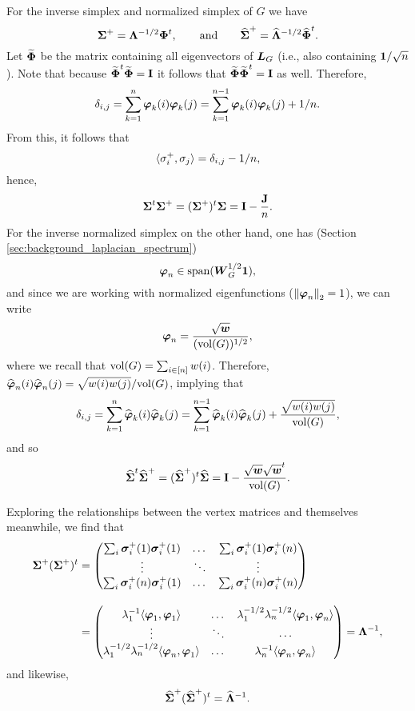 For the inverse simplex and normalized simplex of $G$ we have 
\[\boldsymbol{\Sigma}^+ = \vb{\Lambda}^{-1/2}\boldsymbol{\Phi}^t,\qquad \text{and} \qquad \widehat{\boldsymbol{\Sigma}}^+ = \widehat{\vb{\Lambda}}^{-1/2}\widehat{\boldsymbol{\Phi}}^t.\]
Let $\widetilde{\boldsymbol{\Phi}}$ be the matrix containing all eigenvectors of $\vb*{L}_G$ (i.e., also containing $\vb{1}/\sqrt{n}$).  Note that because $\widetilde{\boldsymbol{\Phi}}^t \widetilde{\boldsymbol{\Phi}}=\vb{I}$ it follows that $\widetilde{\boldsymbol{\Phi}}\widetilde{\boldsymbol{\Phi}}^t=\vb{I}$ as well. Therefore, 
\begin{equation*}\delta_{i,j}=\sum_{k=1}^n \vb*{\varphi}_k(i)\vb*{\varphi}_k(j) = \sum_{k=1}^{n-1} \vb*{\varphi}_k(i)\vb*{\varphi}_k(j) + 1/n.
\end{equation*}
From this, it follows that 
\[\langle\sigma_i^+,\sigma_j\rangle = \delta_{i,j} - 1/n,\]
hence, 
\begin{equation}
\label{eq:sv+sv}
    \boldsymbol{\Sigma}^t\boldsymbol{\Sigma}^+=(\boldsymbol{\Sigma}^+)^t\boldsymbol{\Sigma}=\vb{I}-\frac{\vb{J}}{n}.
\end{equation}
For the inverse normalized simplex on the other hand, one has (Section \ref{sec:background_laplacian_spectrum})
\[\vb*{\varphi}_n \in \textnormal{span}(\vb*{W}_G^{1/2}\vb{1} ),\]
and since we are working with normalized eigenfunctions ($\norm{\vb*{\varphi}_n}_2=1$), we can write 
\[\vb*{\varphi}_n = \frac{\sqrt{\vb*{w}}}{(\textnormal{vol}(G))^{1/2}},\]
where we recall that $\textnormal{vol}(G)=\sum_{i\in[n]} w(i)$. 
Therefore, $\widehat{\vb*{\varphi}}_{n}(i)\widehat{\vb*{\varphi}}_{n}(j)=\sqrt{w(i)w(j)}/\textnormal{vol}(G)$, implying that 
\begin{equation*}\delta_{i,j}=\sum_{k=1}^n \widehat{\vb*{\varphi}}_k(i)\widehat{\vb*{\varphi}}_k(j) = \sum_{k=1}^{n-1} \widehat{\vb*{\varphi}}_k(i)\widehat{\vb*{\varphi}}_k(j) + \frac{\sqrt{w(i)w(j)}}{\textnormal{vol}(G)},
\end{equation*}
and so 
\begin{equation}
\label{eq:svn+svn}
\widehat{\boldsymbol{\Sigma}}^t\widehat{\boldsymbol{\Sigma}}^+=(\widehat{\boldsymbol{\Sigma}}^+)^t\widehat{\boldsymbol{\Sigma}}=\vb{I}-\frac{\sqrt{\vb*{w}}\sqrt{\vb*{w}}^t}{\textnormal{vol}(G)}.
\end{equation}

Exploring the relationships between the vertex matrices and themselves meanwhile,  we find that 
\begin{align}
\boldsymbol{\Sigma}^+(\boldsymbol{\Sigma}^+)^t &= 
\begin{pmatrix}
\sum_i \vb*{\sigma}_i^+(1)\vb*{\sigma}_i^+(1) & \dots & \sum_i \vb*{\sigma}_i^+(1)\vb*{\sigma}_i^+(n) \\
\vdots &\ddots  & \vdots \\
\sum_i \vb*{\sigma}_i^+(n)\vb*{\sigma}_i^+(1) & \dots & \sum_i \vb*{\sigma}_i^+(n)\vb*{\sigma}_i^+(n)
\end{pmatrix}\notag 
\\[10pt] 
&= 
\begin{pmatrix}
\lambda_1^{-1} \langle \vb*{\varphi}_1,\vb*{\varphi}_1\rangle & \dots & \lambda_1^{-1/2}\lambda_n^{-1/2}\langle \vb*{\varphi}_1,\vb*{\varphi}_n\rangle \\
\vdots & \ddots & \cdots \\
\lambda_1^{-1/2}\lambda_n^{-1/2}\langle \vb*{\varphi}_n,\vb*{\varphi}_1\rangle & \dots &\lambda_n^{-1} \langle \vb*{\varphi}_n,\vb*{\varphi}_n\rangle 
\end{pmatrix} = \vb{\Lambda}^{-1},\label{eq:SvSv+}
\end{align}
and likewise, 
\begin{equation}
\label{eq:SvnSvn+}
\widehat{\boldsymbol{\Sigma}}^+(\widehat{\boldsymbol{\Sigma}}^+)^t = \widehat{\vb{\Lambda}}^{-1}.
\end{equation}






